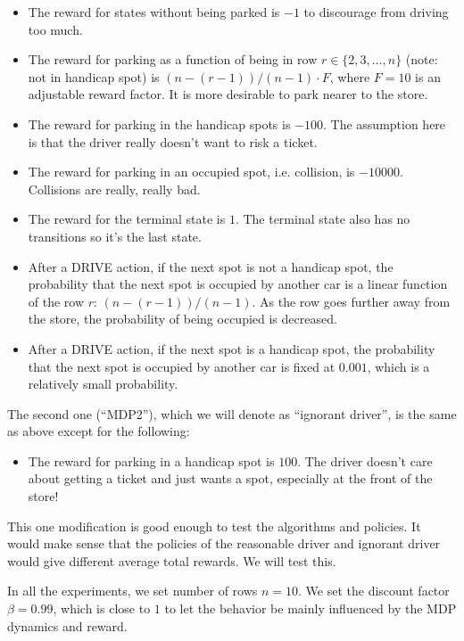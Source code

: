 \documentclass[paper=a4, fontsize=11pt]{scrartcl}
\begin{document}
\begin{itemize}
\item The reward for states without being parked is $-1$ to discourage from driving too much.
\item The reward for parking as a function of being in row $r \in \{2, 3, \ldots, n\}$ (note: not in handicap spot) is $(n-(r-1))/(n-1) \cdot F$, where $F=10$ is an adjustable reward factor. It is more desirable to park nearer to the store.
\item The reward for parking in the handicap spots is $-100$. The assumption here is that the driver really doesn't want to risk a ticket.
\item The reward for parking in an occupied spot, i.e. collision, is $-10000$. Collisions are really, really bad.
\item The reward for the terminal state is $1$. The terminal state also has no transitions so it's the last state.
\item After a DRIVE action, if the next spot is not a handicap spot, the probability that the next spot is occupied by another car is a linear function of the row $r$: $(n-(r-1))/(n-1)$. As the row goes further away from the store, the probability of being occupied is decreased.
\item After a DRIVE action, if the next spot is a handicap spot, the probability that the next spot is occupied by another car is fixed at $0.001$, which is a relatively small probability.
\end{itemize}

The second one (``MDP2''), which we will denote as ``ignorant driver'', is the same as above except for the following:

\begin{itemize}
\item The reward for parking in a handicap spot is $100$. The driver doesn't care about getting a ticket and just wants a spot, especially at the front of the store!
\end{itemize}

This one modification is good enough to test the algorithms and policies. It would make sense that the policies of the reasonable driver and ignorant driver would give different average total rewards. We will test this.

In all the experiments, we set number of rows $n=10$. We set the discount factor $\beta = 0.99$, which is close to $1$ to let the behavior be mainly influenced by the MDP dynamics and reward.
\end{document}
